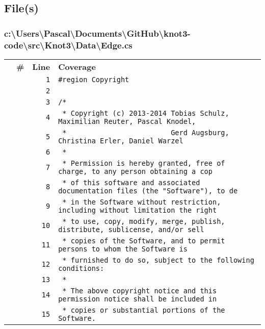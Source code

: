 \documentclass[a4paper,10pt]{article}
\begin{document}
\subsection{File(s)}
\subsubsection{c:\textbackslash Users\textbackslash Pascal\textbackslash Documents\textbackslash GitHub\textbackslash knot3-code\textbackslash src\textbackslash Knot3\textbackslash Data\textbackslash Edge.cs}
\begin{longtable}[l]{lrrl}
\textbf{} & \textbf{\#} & \textbf{Line} & \textbf{Coverage}\\
\cellcolor{gray} &  & \verb~1~ & \verb~#region Copyright~\\
\cellcolor{gray} &  & \verb~2~ & \verb~~\\
\cellcolor{gray} &  & \verb~3~ & \verb~/*~\\
\cellcolor{gray} &  & \verb~4~ & \verb~ * Copyright (c) 2013-2014 Tobias Schulz, Maximilian Reuter, Pascal Knodel,~\\
\cellcolor{gray} &  & \verb~5~ & \verb~ *                         Gerd Augsburg, Christina Erler, Daniel Warzel~\\
\cellcolor{gray} &  & \verb~6~ & \verb~ *~\\
\cellcolor{gray} &  & \verb~7~ & \verb~ * Permission is hereby granted, free of charge, to any person obtaining a cop~\\
\cellcolor{gray} &  & \verb~8~ & \verb~ * of this software and associated documentation files (the "Software"), to de~\\
\cellcolor{gray} &  & \verb~9~ & \verb~ * in the Software without restriction, including without limitation the right~\\
\cellcolor{gray} &  & \verb~10~ & \verb~ * to use, copy, modify, merge, publish, distribute, sublicense, and/or sell~\\
\cellcolor{gray} &  & \verb~11~ & \verb~ * copies of the Software, and to permit persons to whom the Software is~\\
\cellcolor{gray} &  & \verb~12~ & \verb~ * furnished to do so, subject to the following conditions:~\\
\cellcolor{gray} &  & \verb~13~ & \verb~ *~\\
\cellcolor{gray} &  & \verb~14~ & \verb~ * The above copyright notice and this permission notice shall be included in ~\\
\cellcolor{gray} &  & \verb~15~ & \verb~ * copies or substantial portions of the Software.~\\

\end{longtable}
\end{document}
